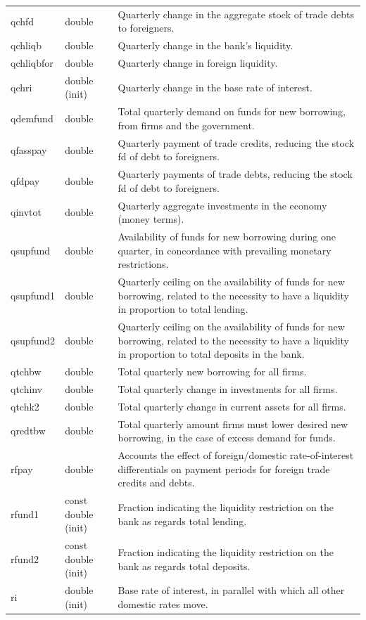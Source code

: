 \documentclass{article}
\begin{document}
\begin{longtable}{p{}p{}p{}}
qchfd & double & Quarterly change in the aggregate stock of trade debts to foreigners.\\
qchliqb & double & Quarterly change in the bank's liquidity.\\
qchliqbfor & double & Quarterly change in foreign liquidity.\\
qchri & double (init) & Quarterly change in the base rate of interest.\\
qdemfund & double & Total quarterly demand on funds for new borrowing, from firms and the government.\\
qfasspay & double & Quarterly payment of trade credits, reducing the stock fd of debt to foreigners.\\
qfdpay & double & Quarterly payments of trade debts, reducing the stock fd of debt to foreigners.\\
qinvtot & double & Quarterly aggregate investments in the economy (money terms).\\
qsupfund & double & Availability of funds for new borrowing during one quarter, in concordance with prevailing monetary restrictions.\\
qsupfund1 & double & Quarterly ceiling on the availability of funds for new borrowing, related to the necessity to have a liquidity in proportion to total lending.\\
qsupfund2 & double & Quarterly ceiling on the availability of funds for new borrowing, related to the necessity to have a liquidity in proportion to total deposits in the bank.\\
qtchbw & double & Total quarterly new borrowing for all firms.\\
qtchinv & double & Total quarterly change in investments for all firms.\\
qtchk2 & double & Total quarterly change in current assets for all firms.\\
qredtbw & double & Total quarterly amount firms must lower desired new borrowing, in the case of excess demand for funds.\\
rfpay & double & Accounts the effect of foreign/domestic rate-of-interest differentials on payment periods for foreign trade credits and debts.\\
rfund1 & const double (init) & Fraction indicating the liquidity restriction on the bank as regards total lending.\\
rfund2 & const double (init) & Fraction indicating the liquidity restriction on the bank as regards total deposits.\\
ri & double (init) & Base rate of interest, in parallel with which all other domestic rates move.\\

\end{longtable}
\end{document}
